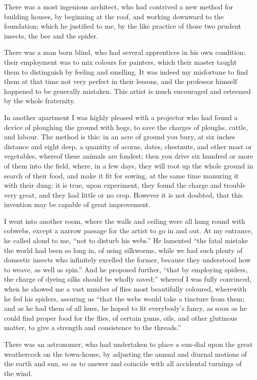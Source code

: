 There was a most ingenious architect, who had contrived a new method for building houses, by beginning at the roof, and working downward to the foundation; which he justified to me, by the like practice of those two prudent insects, the bee and the spider.

There was a man born blind, who had several apprentices in his own condition: their employment was to mix colours for painters, which their master taught them to distinguish by feeling and smelling.  It was indeed my misfortune to find them at that time not very perfect in their lessons, and the professor himself happened to be generally mistaken.  This artist is much encouraged and esteemed by the whole fraternity.

In another apartment I was highly pleased with a projector who had found a device of ploughing the ground with hogs, to save the charges of ploughs, cattle, and labour.  The method is this: in an acre of ground you bury, at six inches distance and eight deep, a quantity of acorns, dates, chestnuts, and other mast or vegetables, whereof these animals are fondest; then you drive six hundred or more of them into the field, where, in a few days, they will root up the whole ground in search of their food, and make it fit for sowing, at the same time manuring it with their dung: it is true, upon experiment, they found the charge and trouble very great, and they had little or no crop.  However it is not doubted, that this invention may be capable of great improvement.

I went into another room, where the walls and ceiling were all hung round with cobwebs, except a narrow passage for the artist to go in and out.  At my entrance, he called aloud to me, “not to disturb his webs.”  He lamented “the fatal mistake the world had been so long in, of using silkworms, while we had such plenty of domestic insects who infinitely excelled the former, because they understood how to weave, as well as spin.”  And he proposed further, “that by employing spiders, the charge of dyeing silks should be wholly saved;” whereof I was fully convinced, when he showed me a vast number of flies most beautifully coloured, wherewith he fed his spiders, assuring us “that the webs would take a tincture from them; and as he had them of all hues, he hoped to fit everybody’s fancy, as soon as he could find proper food for the flies, of certain gums, oils, and other glutinous matter, to give a strength and consistence to the threads.”

There was an astronomer, who had undertaken to place a sun-dial upon the great weathercock on the town-house, by adjusting the annual and diurnal motions of the earth and sun, so as to answer and coincide with all accidental turnings of the wind.

